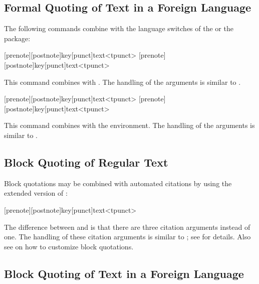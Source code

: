 \documentclass{ltxdockit}[2010/09/26]
\begin{document}
\subsection{Formal Quoting of Text in a Foreign Language}
\label{int:txt:bbl}

The following commands combine  with the language switches of the  or the  package:

\begin{ltxsyntax}

[prenote][postnote]{key}[punct]{text}<tpunct>
[prenote][postnote]{key}[punct]{text}<tpunct>

This command combines  with . The handling of the arguments is similar to .

[prenote][postnote]{key}[punct]{text}<tpunct>
[prenote][postnote]{key}[punct]{text}<tpunct>

This command combines  with the  environment. The handling of the arguments is similar to .

\end{ltxsyntax}

\subsection{Block Quoting of Regular Text}
\label{int:blk:reg}

Block quotations may be combined with automated citations by using the extended version of :

\begin{ltxsyntax}

[prenote][postnote]{key}[punct]{text}<tpunct>

The difference between  and  is that there are three citation arguments instead of one. The handling of these citation arguments is similar to ; see  for details. Also see  on how to customize block quotations.

\end{ltxsyntax}

\subsection{Block Quoting of Text in a Foreign Language}
\label{int:blk:bbl}
\end{document}
